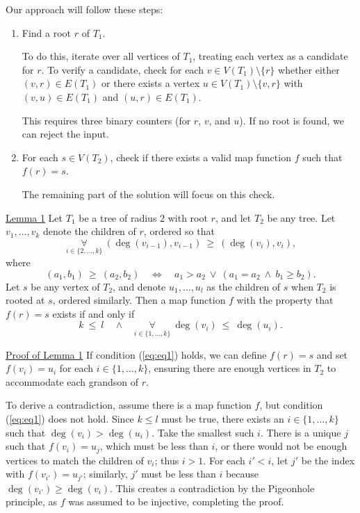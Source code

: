 \documentclass[12pt]{article}
\begin{document}
	Our approach will follow these steps:
	\begin{enumerate}
		\item Find a root \(r\) of \(T_{1}\).
		      
		      To do this, iterate over all vertices of \(T_{1}\), treating each
		      vertex as a candidate for \(r\). To verify a candidate, check for
		      each \(v \in V(T_{1}) \setminus \{r\}\) whether either \((v, r)
		      \in E(T_{1})\) or there exists a vertex \(u \in V(T_{1}) \setminus
		      \{v, r\}\) with \((v, u) \in E(T_{1})\) and \((u, r) \in
		      E(T_{1})\).
		      
		      This requires three binary counters (for \(r\), \(v\), and \(u\)).
		      If no root is found, we can reject the input.
		
		\item For each \(s \in V(T_{2})\), check if there exists a valid map
		      function \(f\) such that \(f(r) = s\).
		      
		      The remaining part of the solution will focus on this check.
	\end{enumerate}
	
	\underline{Lemma 1} Let \(T_{1}\) be a tree of radius \(2\) with root \(r\),
	and let \(T_{2}\) be any tree. Let \(v_{1}, \ldots, v_{k}\) denote the
	children of \(r\), ordered so that
	\[ \underset{i \in \{2, \ldots, k\}}{\forall} \ (\deg(v_{i - 1}), v_{i - 1})
	\ \geqslant \ (\deg(v_{i}), v_{i}) \text{,} \]
	where
	\[ (a_{1}, b_{1}) \ \geqslant \ (a_{2}, b_{2}) \quad \iff \quad a_{1} >
	a_{2} \ \vee \ (a_{1} = a_{2} \ \wedge \ b_{1} \geqslant b_{2}) \text{.} \]
	Let \(s\) be any vertex of \(T_{2}\), and denote \(u_{1}, \ldots, u_{l}\)
	as the children of \(s\) when \(T_{2}\) is rooted at \(s\), ordered
	similarly. Then a map function \(f\) with the property that \(f(r) = s\)
	exists if and only if
	\begin{equation} \label{eq:eq1}
		k \ \leqslant \ l \quad \wedge \quad \underset{i \in \{1, \ldots, k\}}
		{\forall} \ \deg(v_{i}) \ \leqslant \ \deg(u_{i}) \text{.}
	\end{equation}
	
	\underline{Proof of Lemma 1} If condition (\ref{eq:eq1}) holds, we can define
	\(f(r) = s\) and set \(f(v_{i}) = u_{i}\) for each \(i \in \{1, \ldots,
	k\}\), ensuring there are enough vertices in \(T_{2}\) to accommodate each
	grandson of \(r\).
	
	\medskip
	
	To derive a contradiction, assume there is a map function \(f\), but
	condition (\ref{eq:eq1}) does not hold. Since \(k \leqslant l\) must be
	true, there exists an \(i \in \{1, \ldots, k\}\) such that \(\deg(v_{i}) >
	\deg(u_{i})\). Take the smallest such \(i\). There is a unique \(j\)
	such that \(f(v_{i}) = u_{j}\), which must be less than \(i\), or there
	would not be enough vertices to match the children of \(v_{i}\); thus \(i >
	1\). For each \(i' < i\), let \(j'\) be the index with \(f(v_{i'}) =
	u_{j'}\); similarly, \(j'\) must be less than \(i\) because \(\deg(v_{i'})
	\geqslant \deg(v_{i})\). This creates a contradiction by the Pigeonhole
	principle, as \(f\) was assumed to be injective, completing the proof.
	
\end{document}

